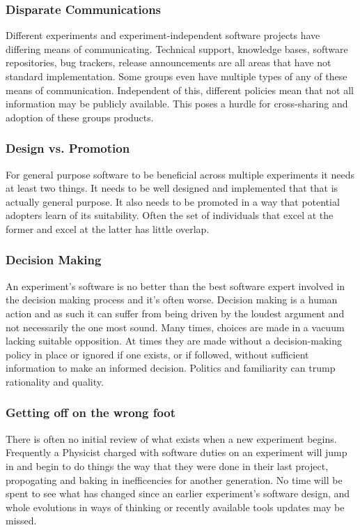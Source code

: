 \subsubsection{Disparate Communications}

Different experiments and experiment-independent software projects
have differing means of communicating.  Technical support, knowledge
bases, software repositories, bug trackers, release announcements are
all areas that have not standard implementation.  Some groups even
have multiple types of any of these means of communication.
Independent of this, different policies mean that not all information
may be publicly available.  This poses a hurdle for cross-sharing and
adoption of these groups products.

\subsubsection{Design vs. Promotion}

For general purpose software to be beneficial across multiple
experiments it needs at least two things.  It needs to be well
designed and implemented that that is actually general purpose.  It
also needs to be promoted in a way that potential adopters learn of
its suitability.  Often the set of individuals that excel at the
former and excel at the latter has little overlap.

\subsubsection{Decision Making}

An experiment's software is no better than the best software expert
involved in the decision making process and it's often worse.
Decision making is a human action and as such it can suffer from being
driven by the loudest argument and not necessarily the one most sound.
Many times, choices are made in a vacuum lacking suitable opposition.
At times they are made without a decision-making policy in place or
ignored if one exists, or if followed, without sufficient information
to make an informed decision.  Politics and familiarity can trump
rationality and quality.

\subsubsection{Getting off on the wrong foot}

There is often no initial review of what exists when a new experiment begins.
Frequently a Physicist charged with software duties on an experiment will 
jump in and begin to do things the way that they were done in their 
last project, propogating and baking in inefficencies for another generation.  
No time will be spent to see what has changed since an earlier experiment's 
software design, and whole evolutions in ways of thinking or recently available
tools updates may be missed.

